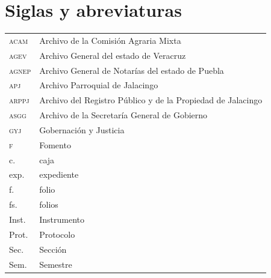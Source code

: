 \documentclass[14pt,twoside,final]{extbook} %
\begin{document}
\chapter*{Siglas y abreviaturas}\label{ch:siglas-y-abreviaturas}
\pagestyle{empty}
\thispagestyle{empty}
\pagestyle{fancy}
\fancyhf{} %
\fancyhead[RO,LE]{\thepage}
\renewcommand{\headrulewidth}{0pt}
\setcounter{page}{17}
\begin{table}[H]
\centering
\begin{tabular}{ll}
\textsc{acam} & Archivo de la Comisión Agraria Mixta \\
\textsc{agev} & Archivo General del estado de Veracruz \\
\textsc{agnep} & Archivo General de Notarías del estado de Puebla \\
\textsc{apj} & Archivo Parroquial de Jalacingo \\
\textsc{arppj} & Archivo del Registro Público y de la Propiedad de Jalacingo \\
\textsc{asgg} & Archivo de la Secretaría General de Gobierno \\
\textsc{gyj} & Gobernación y Justicia \\
\textsc{f} & Fomento \\
c. & caja \\
exp. & expediente \\
f. & folio \\
fs. & folios \\
Inst. & Instrumento \\
Prot. & Protocolo \\
Sec. & Sección \\
Sem. & Semestre \\
\end{tabular}
\label{tab:siglas-y-abreviaturas}
\end{table}
\end{document}
